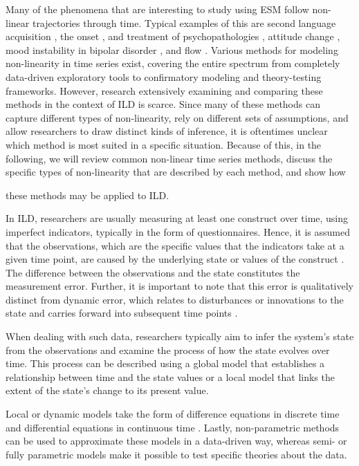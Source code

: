 Many of the phenomena that are interesting to study using ESM follow
non-linear trajectories through time. Typical examples of this are
second language acquisition \parencite{hohenberger_language_2009,
    murakami_modeling_2016, reid_bifurcations_2019}, the onset
\parencite{nelson_moving_2017, van_de_leemput_critical_2014}, and treatment of
psychopathologies \parencite{hayes_change_2007, hosenfeld_major_2015,
    schiepek_complexity_2009}, attitude change
\parencite{van_der_maas_sudden_2003},
mood instability in bipolar disorder \parencite{bonsall_nonlinear_2012}, and
flow
\parencite{ceja_suddenly_2012, ceja_dynamics_2009}.
Various methods for modeling non-linearity in time series exist, covering the
entire spectrum
from completely data-driven exploratory tools to confirmatory modeling and
theory-testing frameworks. However, research extensively examining and
comparing
these methods in the context of ILD is scarce. Since many of these methods can
capture different types of non-linearity, rely on different sets of
assumptions,
and allow researchers to draw distinct kinds of inference, it is oftentimes
unclear which method is most suited in a specific situation. Because of this,
in
the following, we will review common non-linear time series methods, discuss
the
specific types of non-linearity that are described by each method, and show how

these methods may be applied to ILD.

In ILD, researchers are usually measuring at least one construct over time,
using
imperfect indicators, typically in the form of questionnaires. Hence, it is
assumed that the observations, which are the specific values that the
indicators
take at a given time point, are caused by the underlying
state or values of the construct \parencite{mcneish_measurement_2021,
    vogelsmeier_assessing_2023}. The difference between the observations and the
state constitutes the measurement error. Further, it is important to note that
this error is qualitatively distinct from dynamic error, which relates to
disturbances or innovations to the state and carries forward into subsequent
time
points \parencite{schuurman_incorporating_2015}.

When dealing with such data, researchers typically aim to infer the
system's state from the observations and examine the process of how
the state evolves over time. This process can be described using a global
model that establishes a relationship between time and the state values or
a local model that links the extent of the state's change to its present value.

Local or dynamic models take the form of difference equations in discrete time
\parencite{durbin_time_2012, galor_discrete_2007}
and differential equations in continuous time
\parencite{van_montfort_continuous_2018}.
Lastly, non-parametric methods can be used to approximate these models in a
data-driven way,
whereas semi- or fully parametric models make it possible to test specific
theories about the data.
